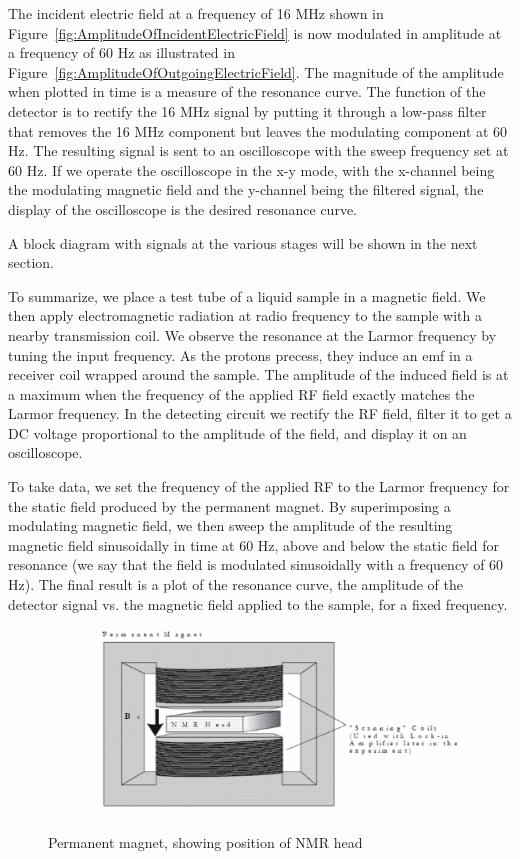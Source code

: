 \documentclass{../lab}
\begin{document}
The incident electric field at a frequency of 16 MHz shown in Figure~\ref{fig:AmplitudeOfIncidentElectricField} is now modulated in amplitude at a frequency of 60 Hz as illustrated in Figure~\ref{fig:AmplitudeOfOutgoingElectricField}. The magnitude of the amplitude when plotted in time is a measure of the resonance curve. The function of the detector is to rectify the 16 MHz signal by putting it through a low-pass filter that removes the 16 MHz component but leaves the modulating component at 60 Hz. The resulting signal is sent to an oscilloscope with the sweep frequency set at 60 Hz. If we operate the oscilloscope in the x-y mode, with the x-channel being the modulating magnetic field and the y-channel being the filtered signal, the display of the oscilloscope is the desired resonance curve.

A block diagram with signals at the various stages will be shown in the next section.

\newpage

To summarize, we place a test tube of a liquid sample in a magnetic field. We then apply electromagnetic radiation at radio frequency to the sample with a nearby transmission coil. We observe the resonance at the Larmor frequency by tuning the input frequency. As the protons precess, they induce an emf in a receiver coil wrapped around the sample. The amplitude of the induced field is at a maximum when the frequency of the applied RF field exactly matches the Larmor frequency. In the detecting circuit we rectify the RF field, filter it to get a DC voltage proportional to the amplitude of the field, and display it on an oscilloscope.

To take data, we set the frequency of the applied RF to the Larmor frequency for the static field produced by the permanent magnet. By superimposing a modulating magnetic field, we then sweep the amplitude of the resulting magnetic field sinusoidally in time at 60 Hz, above and below the static field for resonance (we say that the field is modulated sinusoidally with a frequency of 60 Hz). The final result is a plot of the resonance curve, the amplitude of the detector signal vs. the magnetic field applied to the sample, for a fixed frequency.

\begin{figure}[h]
    \centering
    \href{http://experimentationlab.berkeley.edu/sites/default/files/Permanentmagnet.png}
    {\includegraphics[width=0.5\linewidth]{images/PermanentMagnet.png}}
    \caption{Permanent magnet, showing position of NMR head}
    \label{fig:700px-NMR9}
\end{figure}
\end{document}
